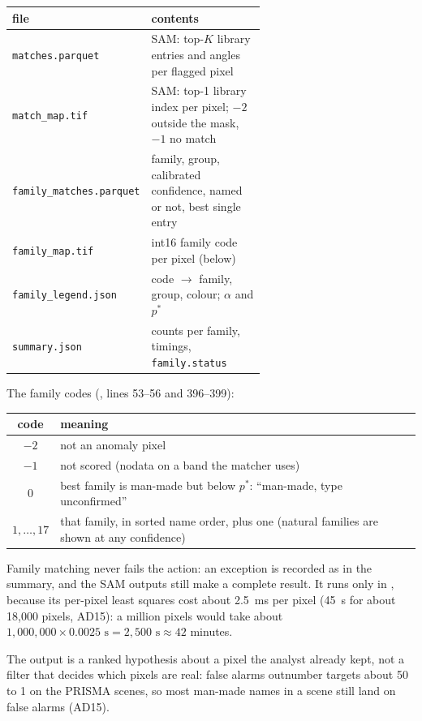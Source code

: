 \begin{center}\small
\begin{tabular}{@{}lp{0.62\linewidth}@{}}
\toprule
file & contents\\
\midrule
\texttt{matches.parquet} & SAM: top-$K$ library entries and angles per flagged pixel\\
\texttt{match\_map.tif} & SAM: top-1 library index per pixel; $-2$ outside the mask, $-1$ no match\\
\texttt{family\_matches.parquet} & family, group, calibrated confidence, named or not, best single entry\\
\texttt{family\_map.tif} & int16 family code per pixel (below)\\
\texttt{family\_legend.json} & code $\to$ family, group, colour; $\alpha$ and $p^*$\\
\texttt{summary.json} & counts per family, timings, \texttt{family.status}\\
\bottomrule
\end{tabular}
\end{center}
The family codes (, lines 53--56 and 396--399):
\begin{center}\small
\begin{tabular}{@{}cl@{}}
\toprule
code & meaning\\
\midrule
$-2$ & not an anomaly pixel\\
$-1$ & not scored (nodata on a band the matcher uses)\\
$0$ & best family is man-made but below $p^*$: ``man-made, type unconfirmed''\\
$1,\dots,17$ & that family, in sorted name order, plus one (natural families are shown at any confidence)\\
\bottomrule
\end{tabular}
\end{center}
Family matching never fails the action: an exception is recorded as  in the
summary, and the SAM outputs still make a complete result. It runs only in ,
because its per-pixel least squares cost about 2.5~ms per pixel (45~s for about 18,000 pixels, AD15): a
million pixels would take about $1{,}000{,}000\times0.0025\text{ s}=2{,}500\text{ s}\approx42$ minutes.

\begin{keypoint}
The output is a ranked hypothesis about a pixel the analyst already kept, not a filter that decides which
pixels are real: false alarms outnumber targets about 50 to 1 on the PRISMA scenes, so most man-made names in
a scene still land on false alarms (AD15).
\end{keypoint}

